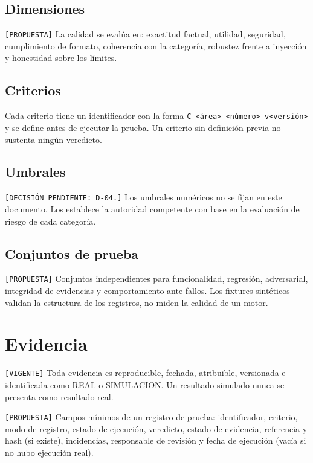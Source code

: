 \documentclass[12pt]{article}
\begin{document}
\subsection{Dimensiones}

\texttt{[PROPUESTA]} La calidad se evalúa en: exactitud factual, utilidad,
seguridad, cumplimiento de formato, coherencia con la categoría, robustez
frente a inyección y honestidad sobre los límites.

\subsection{Criterios}

Cada criterio tiene un identificador con la forma
\texttt{C-<área>-<número>-v<versión>} y se define antes de ejecutar la
prueba. Un criterio sin definición previa no sustenta ningún veredicto.

\subsection{Umbrales}

\texttt{[DECISIÓN PENDIENTE: D-04.]} Los umbrales numéricos no se fijan en
este documento. Los establece la autoridad competente con base en la
evaluación de riesgo de cada categoría.

\subsection{Conjuntos de prueba}

\texttt{[PROPUESTA]} Conjuntos independientes para funcionalidad, regresión,
adversarial, integridad de evidencias y comportamiento ante fallos. Los
fixtures sintéticos validan la estructura de los registros, no miden la
calidad de un motor.

\section{Evidencia}
\label{sec:evidencia}

\texttt{[VIGENTE]} Toda evidencia es reproducible, fechada, atribuible,
versionada e identificada como REAL o SIMULACION. Un resultado simulado
nunca se presenta como resultado real.

\texttt{[PROPUESTA]} Campos mínimos de un registro de prueba: identificador,
criterio, modo de registro, estado de ejecución, veredicto, estado de
evidencia, referencia y hash (si existe), incidencias, responsable de
revisión y fecha de ejecución (vacía si no hubo ejecución real).
\end{document}
